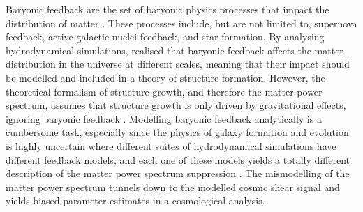 Baryonic feedback are the set of baryonic physics processes that impact the distribution of matter \citep{Rudd_Zentner_Kravtsov_2008}. These processes include, but are not limited to, supernova feedback, active galactic nuclei feedback, and star formation. By analysing hydrodynamical simulations,  \citet{van2011effects} realised that baryonic feedback affects the matter distribution in the universe at different scales, meaning that their impact should be modelled and included in a theory of structure formation. However, the theoretical formalism of structure growth, and therefore the matter power spectrum, assumes that structure growth is only driven by gravitational effects, ignoring baryonic feedback \citep{Dodelson_Schmidt_2026}. Modelling baryonic feedback analytically is a cumbersome task, especially since the physics of galaxy formation and evolution is highly uncertain where different suites of hydrodynamical simulations have different feedback models, and each one of these models yields a totally different description of the matter power spectrum suppression \citep{van2011effects}. The mismodelling of the matter power spectrum tunnels down to the modelled cosmic shear signal and yields biased parameter estimates in a cosmological analysis.

